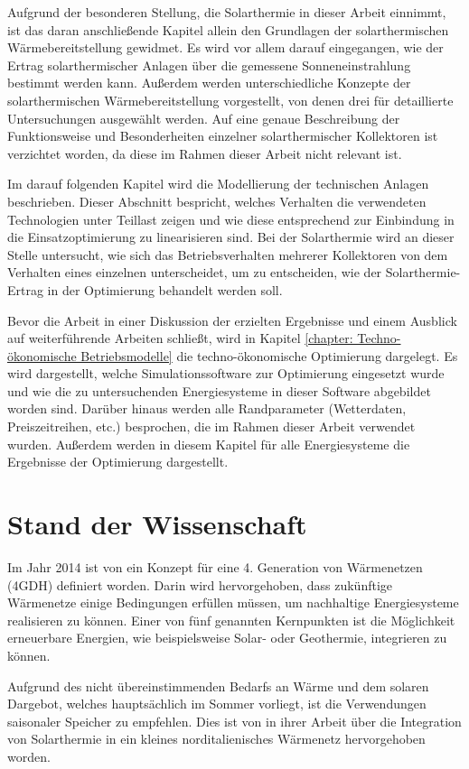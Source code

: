 Aufgrund der besonderen Stellung, die Solarthermie in dieser Arbeit einnimmt, ist das daran anschließende Kapitel allein den Grundlagen der solarthermischen Wärmebereitstellung gewidmet. Es wird vor allem darauf eingegangen, wie der Ertrag solarthermischer Anlagen über die gemessene Sonneneinstrahlung bestimmt werden kann. Außerdem werden unterschiedliche Konzepte der solarthermischen Wärmebereitstellung vorgestellt, von denen drei für detaillierte Untersuchungen ausgewählt werden. Auf eine genaue Beschreibung der Funktionsweise und Besonderheiten einzelner solarthermischer Kollektoren ist verzichtet worden, da diese im Rahmen dieser Arbeit nicht relevant ist. 

Im darauf folgenden Kapitel wird die Modellierung der technischen Anlagen beschrieben. Dieser Abschnitt bespricht, welches Verhalten die verwendeten Technologien unter Teillast zeigen und wie diese entsprechend zur Einbindung in die Einsatzoptimierung zu linearisieren sind. Bei der Solarthermie wird an dieser Stelle untersucht, wie sich das Betriebsverhalten mehrerer Kollektoren von dem Verhalten eines einzelnen unterscheidet, um zu entscheiden, wie der Solarthermie-Ertrag in der Optimierung behandelt werden soll.

Bevor die Arbeit in einer Diskussion der erzielten Ergebnisse und einem Ausblick auf weiterführende Arbeiten schließt, wird in Kapitel \ref{chapter: Techno-ökonomische Betriebsmodelle} die techno-ökonomische Optimierung dargelegt. Es wird dargestellt, welche Simulationssoftware zur Optimierung eingesetzt wurde und wie die zu untersuchenden Energiesysteme in dieser Software abgebildet worden sind. Darüber hinaus werden alle Randparameter (Wetterdaten, Preiszeitreihen, etc.) besprochen, die im Rahmen dieser Arbeit verwendet wurden. Außerdem werden in diesem Kapitel für alle Energiesysteme die Ergebnisse der Optimierung dargestellt.

\section{Stand der Wissenschaft}
Im Jahr 2014 ist von \citet{LUND20141} ein Konzept für eine 4. Generation von Wärmenetzen (\ac{4GDH}) definiert worden. Darin wird hervorgehoben, dass zukünftige Wärmenetze einige Bedingungen erfüllen müssen, um nachhaltige Energiesysteme realisieren zu können. Einer von fünf genannten Kernpunkten ist die Möglichkeit erneuerbare Energien, wie beispielsweise Solar- oder Geothermie, integrieren zu können.

Aufgrund des nicht übereinstimmenden Bedarfs an Wärme und dem solaren Dargebot, welches hauptsächlich im Sommer vorliegt, ist die Verwendungen saisonaler Speicher zu empfehlen. Dies ist von \citet{CARPANETO2015714} in ihrer Arbeit über die Integration von Solarthermie in ein kleines norditalienisches Wärmenetz hervorgehoben worden.

